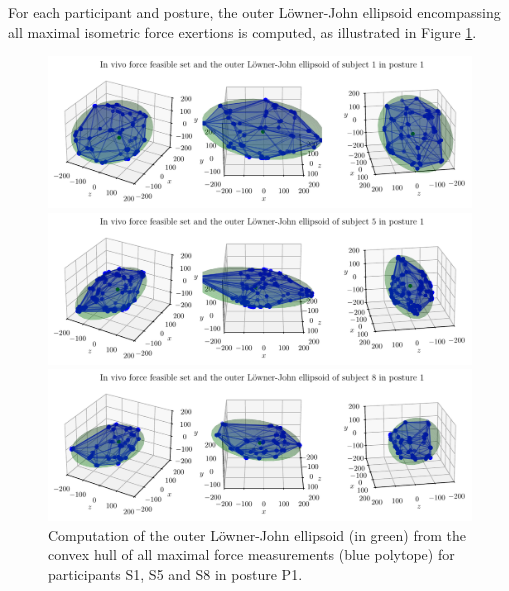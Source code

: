 For each participant and posture, the outer Löwner-John ellipsoid encompassing all maximal isometric force exertions is computed, as illustrated in Figure \ref{fig:in_vivo_lj_ffs_example_posture1}.
\begin{figure}[!htb]
    \centering
    \captionsetup{justification=centering}
    
    \begin{minipage}{1\linewidth}
        \captionsetup{justification=centering}
        \centering
        \includegraphics[trim={0 0 0 0}, clip, width=1\linewidth]{img/chapter_5/subject_489_lj_ffs_posture_1.pdf}
    \end{minipage}

    \begin{minipage}{1\linewidth}
        \captionsetup{justification=centering}
        \centering
        \includegraphics[trim={0 0 0 0}, clip, width=1\linewidth]{img/chapter_5/subject_296_lj_ffs_posture_1.pdf}
    \end{minipage}

    \begin{minipage}{1\linewidth}
        \captionsetup{justification=centering}
        \centering
        \includegraphics[trim={0 0 0 0}, clip, width=1\linewidth]{img/chapter_5/subject_163_lj_ffs_posture_1.pdf}
    \end{minipage}
    \caption{Computation of the outer Löwner-John ellipsoid (in green) from the convex hull of all maximal force measurements (blue polytope) for participants S1, S5 and S8 in posture P1.}
    \label{fig:in_vivo_lj_ffs_example_posture1}
\end{figure}

